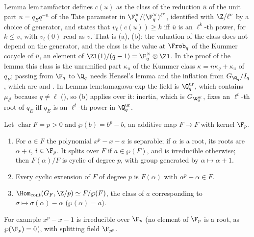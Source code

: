 \begin{paperlink}
Lemma lem:tamfactor defines $c(u)$ as the class of the reduction $\bar u$ of the unit part $u=q_Eq^{-n}$ of the Tate parameter in
$\F_q^\times/(\F_q^\times)^{\ell^v}$, identified with $\Z/\ell^v$ by a choice of generator, and states that $v_\ell(c(u))\ge k$ iff $\bar u$ is an $\ell^k$-th power, for
$k\le v$, with $v_\ell(0)$ read as $v$. That is (a), (b): the valuation of the class does not depend on the generator, and
the class is the value at $\Frob_q$ of the Kummer cocycle of $\bar u$, an element of $\Zl(1)/(q-1)=\F_q^\times\otimes\Zl$. In the proof of the lemma this class is the
unramified part $\kappa_u$ of the Kummer class $\kappa=n\kappa_q+\kappa_u$ of $q_E$; passing from $\F_q$ to $\Q_q$ needs Hensel's lemma and the inflation from $G_{\Q_q}/I_q$,
which are  and . In Lemma lem:tamagawa-exp the field is $\Q_q^{\mathrm{ur}}$, which contains $\mu_{\ell^t}$ because $q\ne\ell$
(), so (b) applies over it: inertia, which is $G_{\Q_q^{\mathrm{ur}}}$, fixes an $\ell^t$-th root of $q_E$ iff $q_E$ is an
$\ell^t$-th power in $\Q_q^{\mathrm{ur}}$.
\end{paperlink}

\begin{theorem}\label{thm:galois:artin-schreier}
Let $\operatorname{char}F=p>0$ and $\wp(b)=b^p-b$, an additive map $F\to F$ with kernel $\F_p$.
\begin{enumerate}[label=(\alph*)]
\item For $a\in F$ the polynomial $x^p-x-a$ is separable; if $\alpha$ is a root, its roots are $\alpha+i$, $i\in\F_p$. It splits over $F$ if $a\in\wp(F)$, and is
irreducible otherwise; then $F(\alpha)/F$ is cyclic of degree $p$, with group generated by $\alpha\mapsto\alpha+1$.
\item Every cyclic extension of $F$ of degree $p$ is $F(\alpha)$ with $\alpha^p-\alpha\in F$.
\item $\Hom_{\mathrm{cont}}(G_F,\Z/p)\simeq F/\wp(F)$, the class of $a$ corresponding to $\sigma\mapsto\sigma(\alpha)-\alpha$ ($\wp(\alpha)=a$).
\end{enumerate}
For example $x^p-x-1$ is irreducible over $\F_p$ (no element of $\F_p$ is a root, as $\wp(\F_p)=0$), with splitting field $\F_{p^p}$.
\end{theorem}

